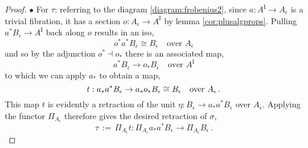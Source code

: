 \documentclass[11pt]{amsart}
\newcommand{\ra}{\ensuremath{\rightarrow}}
\newcommand{\I}{\ensuremath{\mathrm{I}}}
\theoremstyle{remark}
\theoremstyle{definition}
\begin{document}
\begin{proof}
\noindent $\bullet$ For $\tau$: referring to the diagram \eqref{diagram:frobenius2}, since $a : A^\I \ra A_\epsilon$ is a trivial fibration, it has a section $o :  A_\epsilon \ra A^\I$ by lemma \ref{cor:plusalgprops}.  Pulling  $a^*B_\epsilon \ra A^\I$ back along $o$ results in an iso,
\[
o^*a^* B_\epsilon \cong B_\epsilon\quad\text{over $A_\epsilon$}
\]
and so by the adjunction $o^*\!\dashv o_*$ there is an associated map,
\[
a^* B_\epsilon \ra o_* B_\epsilon\quad\text{over $A^\I$}
\]
to which we can apply $a_*$ to obtain a map,
\[
t : a_*a^* B_\epsilon \ra a_*o_*B_\epsilon \cong B_\epsilon\quad \text{over $A_\epsilon$\,.}
\]
This map $t$ is evidently a retraction of the unit $\eta : B_\epsilon \ra a_*a^* B_\epsilon$ over $A_\epsilon$.  Applying the functor $ \Pi_{A_\epsilon}$ therefore gives the desired retraction  of $\sigma$, 
\[
\tau\, :=\, \Pi_{A_\epsilon}t :  \Pi_{A_\epsilon}a_*a^* B_\epsilon \ra \Pi_{A_\epsilon}B_\epsilon\,.
\]


\end{proof}
\end{document}
